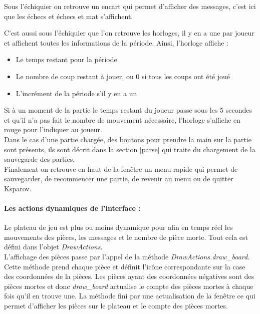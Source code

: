 \documentclass[a4paper]{article}
\begin{document}
Sous l'échiquier on retrouve un encart qui permet d'afficher des messages, c'est ici que les échecs et échecs et mat s'affichent.

C'est aussi sous l'échiquier que l'on retrouve les horloges, il y en a une par joueur et affichent toutes les informations de la période. Ainsi, l'horloge affiche :
\begin{itemize}
\item Le temps restant pour la période
\item Le nombre de coup restant à jouer, ou 0 si tous les coups ont été joué
\item L'incrément de la période s'il y en a un 
\end{itemize}

Si à un moment de la partie le temps restant du joueur passe sous les 5 secondes et qu'il n'a pas fait le nombre de mouvement nécessaire, l'horloge s'affiche en rouge pour l'indiquer au joueur. \\

Dans le cas d'une partie chargée, des boutons pour prendre la main sur la partie sont présents, ils sont décrit dans la section \ref{parse} qui traite du chargement de la sauvegarde des parties. \\

Finalement on retrouve en haut de la fenêtre un menu rapide qui permet de sauvegarder, de recommencer une partie, de revenir au menu ou de quitter Ksparov.

\paragraph{Les actions dynamiques de l'interface :}Le plateau de jeu est plus ou moins dynamique pour afin en temps réel les mouvements des pièces, les messages et le nombre de pièce morte. Tout cela est défini dans l'objet \textit{DrawActions}. \\

L'affichage des pièces passe par l'appel de la méthode \textit{DrawActions.draw\_board}. Cette méthode prend chaque pièce et définit l'icône correspondante sur la case des coordonnées de la pièces. Les pièces ayant des coordonnées négatives sont des pièces mortes et donc \textit{draw\_board} actualise le compte des pièces mortes à chaque fois qu'il en trouve une. La méthode fini par une actualisation de la fenêtre ce qui permet d'afficher les pièces sur le plateau et le compte des pièces mortes. \\
\end{document}
